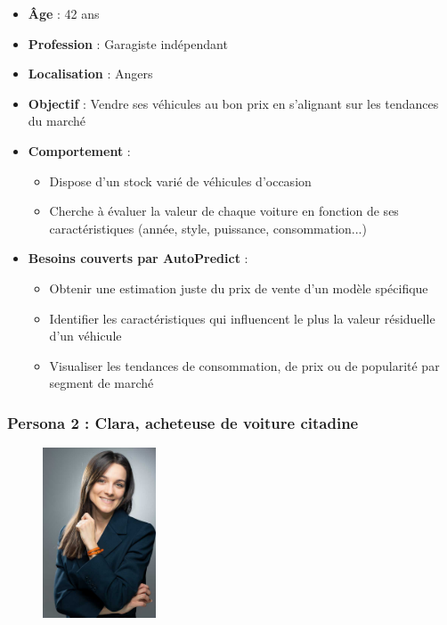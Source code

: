 \documentclass[12pt]{report}
\begin{document}
\begin{itemize}
    \item \textbf{Âge} : 42 ans
    \item \textbf{Profession} : Garagiste indépendant
    \item \textbf{Localisation} : Angers
    \item \textbf{Objectif} : Vendre ses véhicules au bon prix en s’alignant sur les tendances du marché
    \item \textbf{Comportement} :
    \begin{itemize}
        \item Dispose d’un stock varié de véhicules d’occasion
        \item Cherche à évaluer la valeur de chaque voiture en fonction de ses caractéristiques (année, style, puissance, consommation...)
    \end{itemize}
    \item \textbf{Besoins couverts par AutoPredict} :
    \begin{itemize}
        \item Obtenir une estimation juste du prix de vente d’un modèle spécifique
        \item Identifier les caractéristiques qui influencent le plus la valeur résiduelle d’un véhicule
        \item Visualiser les tendances de consommation, de prix ou de popularité par segment de marché
    \end{itemize}
\end{itemize}

\subsubsection{Persona 2 : Clara, acheteuse de voiture citadine}

\begin{figure}[H]
\centering
\includegraphics[width=0.3\textwidth]{clara.jpg}
\end{figure}
\end{document}
